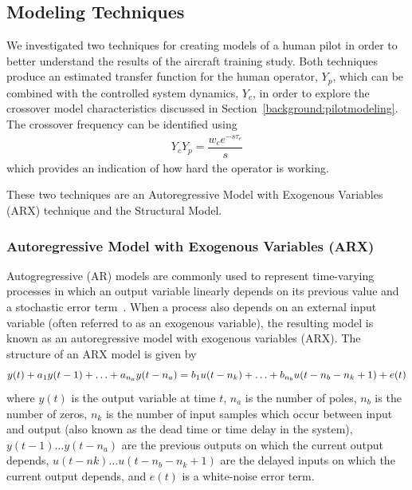 \subsection{Modeling Techniques}
We investigated two techniques for creating models of a human pilot in order to better understand the results of the aircraft training study.
Both techniques produce an estimated transfer function for the human operator, $Y_p$, which can be combined with the controlled system dynamics, $Y_c$, in order to explore the crossover model characteristics discussed in Section~\ref{background:pilotmodeling}.
The crossover frequency can be identified using
\begin{align}
    Y_c Y_p = \dfrac{w_c e^{-s \tau_e}}{s}
\end{align}
which provides an indication of how hard the operator is working.

These two techniques are an Autoregressive Model with Exogenous Variables (ARX) technique and the Structural Model.

\subsubsection{Autoregressive Model with Exogenous Variables (ARX)}
Autogregressive (AR) models are commonly used to represent time-varying processes in which an output variable linearly depends on its previous value and a stochastic error term~\citep{yule1927method}.
When a process also depends on an external input variable (often referred to as an exogenous variable), the resulting model is known as an autoregressive model with exogenous variables (ARX).
The structure of an ARX model is given by
\begin{equation}
    y(t) + a_1 y(t-1) + \ldots + a_{n_a} y(t - n_a) = \\
    b_1 u(t-n_k) + \ldots + b_{n_b} u(t-n_b - n_k+1) + e(t)
\end{equation}
where $y(t)$ is the output variable at time $t$, $n_a$ is the number of poles, $n_b$ is the number of zeros, $n_k$ is the number of input samples which occur between input and output (also known as the dead time or time delay in the system), $y(t-1) \ldots y(t-n_a)$ are the previous outputs on which the current output depends, $u(t-nk) \ldots u(t-n_b - n_k+1)$ are the delayed inputs on which the current output depends, and $e(t)$ is a white-noise error term.

